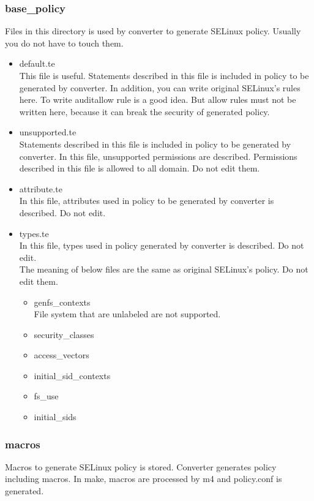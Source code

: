 \subsubsection{base\_policy}\label{sec:basepolicy}
Files in this directory is used by converter to generate SELinux
policy. Usually you do not have to touch them.
  \begin{itemize}
  \item default.te \\ 
    This file is useful. Statements described in this file is included
	in policy to be generated by converter. 
 In addition, you can write original SELinux's rules here. To write auditallow rule is a good idea. But allow rules must not be written here, because it can break the security of generated policy.

   \item unsupported.te\\
Statements described in this file is included
	in policy to be generated by converter. In this file,
	unsupported permissions are described. Permissions described in
	this file is allowed to all domain. Do not edit them.
   \item attribute.te \\  
	In this file, attributes used in policy to be generated by converter is described. Do not edit.
   \item types.te\\
	In this file, types used in policy generated by converter is described. Do not edit.\\
  The meaning of below files are the same as original SELinux's
	policy. Do not edit them.
	

	\begin{itemize}
	 \item genfs\_contexts\\
	       File system that are unlabeled are not supported.
	 \item security\_classes
	 \item access\_vectors  
	 \item initial\_sid\_contexts
	 \item fs\_use 
	 \item initial\_sids
	\end{itemize}
  \end{itemize}

\subsubsection{macros}
Macros to generate SELinux policy is stored. Converter generates policy
including macros. In make, macros are processed by m4 and policy.conf is
generated. 

